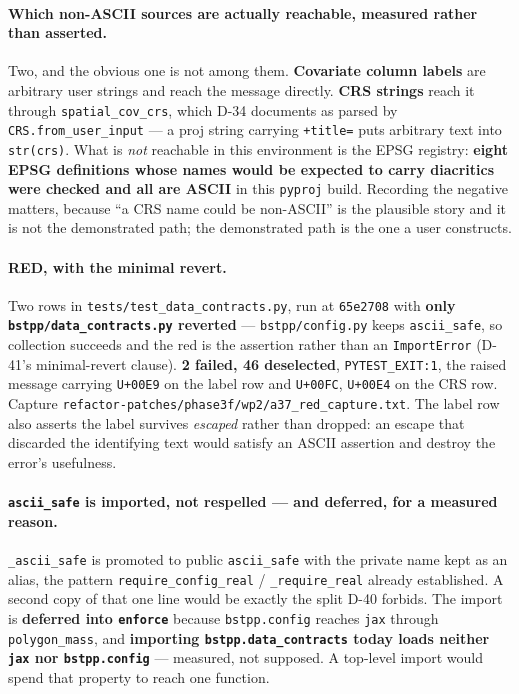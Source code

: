 \documentclass[
  10pt,
]{article}
\begin{document}
\paragraph{Which non-ASCII sources are actually reachable, measured rather than asserted.}
Two, and the obvious one is not among them. \textbf{Covariate column labels} are arbitrary user strings and reach the message directly. \textbf{CRS strings} reach it through \texttt{spatial\_cov\_crs}, which D-34 documents as parsed by \texttt{CRS.\allowbreak{}from\_user\_input} --- a proj string carrying \texttt{+title=} puts arbitrary text into \texttt{str(crs)}. What is \emph{not} reachable in this environment is the EPSG registry: \textbf{eight EPSG definitions whose names would be expected to carry diacritics were checked and all are ASCII} in this \texttt{pyproj} build. Recording the negative matters, because ``a CRS name could be non-ASCII'' is the plausible story and it is not the demonstrated path; the demonstrated path is the one a user constructs.

\paragraph{RED, with the minimal revert.}
Two rows in \texttt{tests/\allowbreak{}test\_data\_contracts.py}, run at \texttt{65e2708} with \textbf{only \texttt{bstpp/data\_contracts.py} reverted} --- \texttt{bstpp/config.py} keeps \texttt{ascii\_safe}, so collection succeeds and the red is the assertion rather than an \texttt{ImportError} (D-41's minimal-revert clause). \textbf{2 failed, 46 deselected}, \texttt{PYTEST\_EXIT:1}, the raised message carrying \texttt{U+00E9} on the label row and \texttt{U+00FC}, \texttt{U+00E4} on the CRS row. Capture \texttt{refactor-patches/\allowbreak{}phase3f/wp2/\allowbreak{}a37\_red\_capture.txt}. The label row also asserts the label survives \emph{escaped} rather than dropped: an escape that discarded the identifying text would satisfy an ASCII assertion and destroy the error's usefulness.

\paragraph{\texttt{ascii\_safe} is imported, not respelled --- and deferred, for a measured reason.}
\texttt{\_ascii\_safe} is promoted to public \texttt{ascii\_safe} with the private name kept as an alias, the pattern \texttt{require\_config\_real} / \texttt{\_require\_real} already established. A second copy of that one line would be exactly the split D-40 forbids. The import is \textbf{deferred into \texttt{enforce}} because \texttt{bstpp.config} reaches \texttt{jax} through \texttt{polygon\_mass}, and \textbf{importing \texttt{bstpp.data\_contracts} today loads neither \texttt{jax} nor \texttt{bstpp.config}} --- measured, not supposed. A top-level import would spend that property to reach one function.
\end{document}
